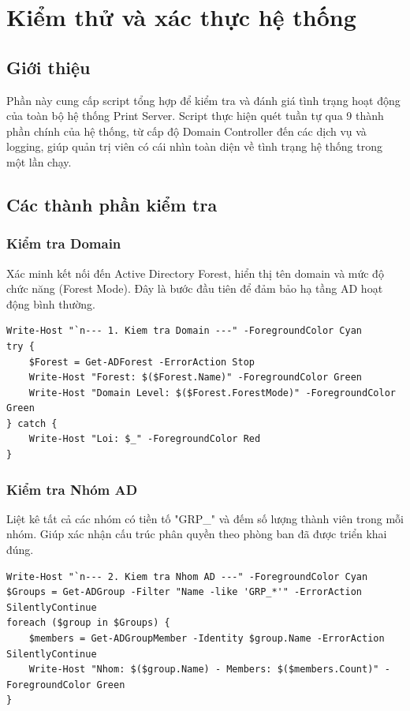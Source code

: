 \chapter{\textbf{Kiểm thử và xác thực hệ thống}}
\section{Giới thiệu}
Phần này cung cấp script tổng hợp để kiểm tra và đánh giá tình trạng hoạt động của toàn bộ hệ thống Print Server. Script thực hiện quét tuần tự qua 9 thành phần chính của hệ thống, từ cấp độ Domain Controller đến các dịch vụ và logging, giúp quản trị viên có cái nhìn toàn diện về tình trạng hệ thống trong một lần chạy.

\section{Các thành phần kiểm tra}

\subsection{Kiểm tra Domain}
Xác minh kết nối đến Active Directory Forest, hiển thị tên domain và mức độ chức năng (Forest Mode). Đây là bước đầu tiên để đảm bảo hạ tầng AD hoạt động bình thường.

\begin{lstlisting}[style=powershell]
Write-Host "`n--- 1. Kiem tra Domain ---" -ForegroundColor Cyan
try {
    $Forest = Get-ADForest -ErrorAction Stop
    Write-Host "Forest: $($Forest.Name)" -ForegroundColor Green
    Write-Host "Domain Level: $($Forest.ForestMode)" -ForegroundColor Green
} catch {
    Write-Host "Loi: $_" -ForegroundColor Red
}
\end{lstlisting}

\subsection{Kiểm tra Nhóm AD}
Liệt kê tất cả các nhóm có tiền tố "GRP\_" và đếm số lượng thành viên trong mỗi nhóm. Giúp xác nhận cấu trúc phân quyền theo phòng ban đã được triển khai đúng.

\begin{lstlisting}[style=powershell]
Write-Host "`n--- 2. Kiem tra Nhom AD ---" -ForegroundColor Cyan
$Groups = Get-ADGroup -Filter "Name -like 'GRP_*'" -ErrorAction SilentlyContinue
foreach ($group in $Groups) {
    $members = Get-ADGroupMember -Identity $group.Name -ErrorAction SilentlyContinue
    Write-Host "Nhom: $($group.Name) - Members: $($members.Count)" -ForegroundColor Green
}
\end{lstlisting}

